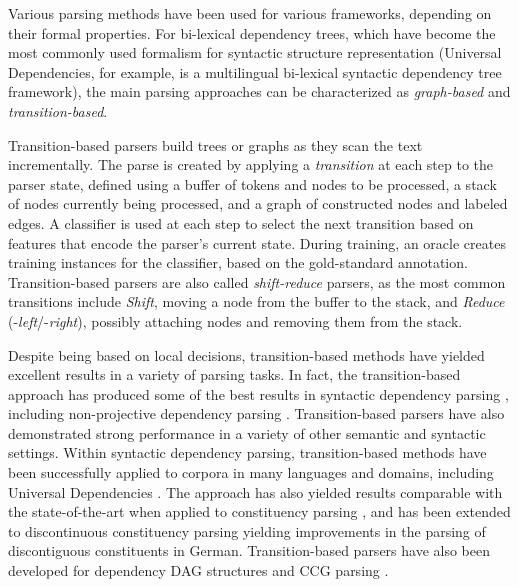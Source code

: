 \documentclass[12pt,a4paper,table]{report}
\renewcommand\cite{\citep}      %
\begin{document}
Various parsing methods have been used for various frameworks,
depending on their formal properties.
For bi-lexical dependency trees, which have become the most commonly used
formalism for syntactic structure representation
(Universal Dependencies, for example, is a multilingual bi-lexical
syntactic dependency tree framework), the main parsing approaches can be
characterized as \textit{graph-based} and \textit{transition-based}.

Transition-based parsers \citep{Nivre03anefficient,nivre2008algorithms} build trees or graphs
as they scan the text incrementally.
The parse is created by applying a \textit{transition} at each step to the parser state,
defined using a buffer of tokens and nodes to be processed,
a stack of nodes currently being processed,
and a graph of constructed nodes and labeled edges.
A classifier is used at each step to select the next transition based on features
that encode the parser's current state.
During training, an oracle creates training instances for the classifier,
based on the gold-standard annotation.
Transition-based parsers are also called \textit{shift-reduce} parsers, as
the most common transitions include \textit{Shift}, moving a node from the buffer
to the stack, and \textit{Reduce} (-\textit{left}/-\textit{right}), possibly attaching nodes and removing them from
the stack.

Despite being based on local decisions, transition-based methods have yielded excellent
results in a variety of parsing tasks.
In fact, the transition-based approach has produced some of the best
results in syntactic dependency parsing
\citep{dyer2015transition,ballesteros2015improved,kiperwasser2016simple,andor2016globally}, 
including non-projective dependency parsing \cite{nivre2009non,kuhlmann2010transition,bohnet2012transition}.
Transition-based parsers have also demonstrated
strong performance in a variety of other semantic and syntactic settings.
Within syntactic dependency parsing, transition-based methods
have been successfully applied to corpora in many languages and domains,
including Universal Dependencies \cite{udpipe,udpipe:2017,de2017old}. 
The approach has also yielded results comparable with the state-of-the-art when applied
to constituency parsing \cite{sagae2005classifier,zhang2009transition,zhu2013fast}, and has been extended to
discontinuous constituency parsing \cite{maier2015discontinuous,maier-lichte:2016:DiscoNLP}
yielding improvements in the parsing of discontiguous constituents in German.
Transition-based parsers have also been developed for dependency DAG structures
\cite{sagae2008shift,tokgoz2015transition} and CCG parsing \cite{ambati2015incremental}.
\end{document}
